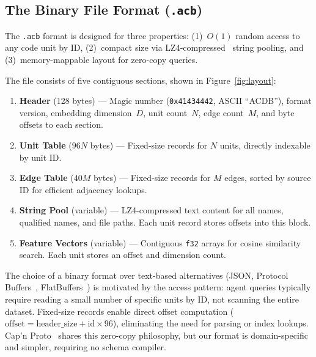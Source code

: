 \documentclass[10pt, twocolumn]{article}
\newcommand{\acbfile}{\texttt{.acb}\xspace}
\begin{document}
\subsection{The Binary File Format (\acbfile)}
\label{sec:format}

The \acbfile format is designed for three properties: (1)~$O(1)$ random access to any code unit by ID, (2)~compact size via LZ4-compressed~\cite{collet2013lz4} string pooling, and (3)~memory-mappable layout for zero-copy queries.

The file consists of five contiguous sections, shown in Figure~\ref{fig:layout}:

\begin{enumerate}[nosep, leftmargin=*]
  \item \textbf{Header} (128 bytes) --- Magic number (\texttt{0x41434442}, ASCII ``ACDB''), format version, embedding dimension~$D$, unit count~$N$, edge count~$M$, and byte offsets to each section.
  \item \textbf{Unit Table} ($96N$ bytes) --- Fixed-size records for $N$ units, directly indexable by unit ID.
  \item \textbf{Edge Table} ($40M$ bytes) --- Fixed-size records for $M$ edges, sorted by source ID for efficient adjacency lookups.
  \item \textbf{String Pool} (variable) --- LZ4-compressed text content for all names, qualified names, and file paths. Each unit record stores offsets into this block.
  \item \textbf{Feature Vectors} (variable) --- Contiguous \texttt{f32} arrays for cosine similarity search. Each unit stores an offset and dimension count.
\end{enumerate}

The choice of a binary format over text-based alternatives (JSON, Protocol Buffers~\cite{protobuf2008}, FlatBuffers~\cite{flatbuffers2014}) is motivated by the access pattern: agent queries typically require reading a small number of specific units by ID, not scanning the entire dataset. Fixed-size records enable direct offset computation ($\text{offset} = \text{header\_size} + \text{id} \times 96$), eliminating the need for parsing or index lookups. Cap'n Proto~\cite{capnproto2013} shares this zero-copy philosophy, but our format is domain-specific and simpler, requiring no schema compiler.
\end{document}
